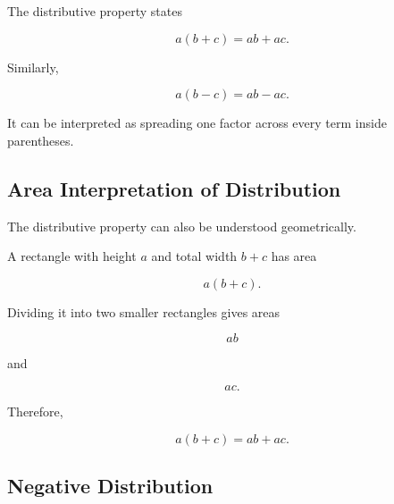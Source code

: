 The distributive property states

\[ a(b+c)=ab+ac. \]

Similarly,

\[ a(b-c)=ab-ac. \]

It can be interpreted as spreading one factor across every term inside
parentheses.

\begin{center}
\end{center}

\subsection{Area Interpretation of Distribution}
\label{subsec:area-distribution}

The distributive property can also be understood geometrically.

A rectangle with height \(a\) and total width \(b+c\) has area

\[ a(b+c). \]

Dividing it into two smaller rectangles gives areas

\[ ab \]

and

\[ ac. \]

\begin{center}
\end{center}

Therefore,

\[ a(b+c)=ab+ac. \]

\subsection{Negative Distribution}
\label{subsec:negative-distribution}


